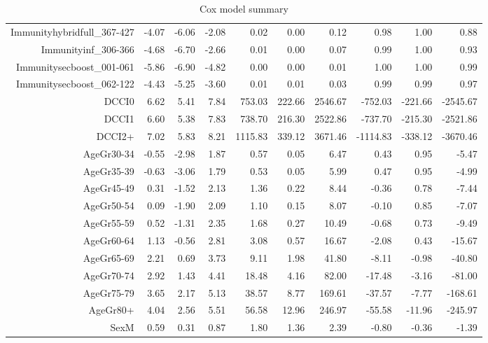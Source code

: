 \begin{table}[ht]
\begin{tabular}{rrrrrrrrrr}
  Immunityhybridfull\_367-427 & -4.07 & -6.06 & -2.08 & 0.02 & 0.00 & 0.12 & 0.98 & 1.00 & 0.88 \\ 
  Immunityinf\_306-366 & -4.68 & -6.70 & -2.66 & 0.01 & 0.00 & 0.07 & 0.99 & 1.00 & 0.93 \\ 
  Immunitysecboost\_001-061 & -5.86 & -6.90 & -4.82 & 0.00 & 0.00 & 0.01 & 1.00 & 1.00 & 0.99 \\ 
  Immunitysecboost\_062-122 & -4.43 & -5.25 & -3.60 & 0.01 & 0.01 & 0.03 & 0.99 & 0.99 & 0.97 \\ 
  DCCI0 & 6.62 & 5.41 & 7.84 & 753.03 & 222.66 & 2546.67 & -752.03 & -221.66 & -2545.67 \\ 
  DCCI1 & 6.60 & 5.38 & 7.83 & 738.70 & 216.30 & 2522.86 & -737.70 & -215.30 & -2521.86 \\ 
  DCCI2+ & 7.02 & 5.83 & 8.21 & 1115.83 & 339.12 & 3671.46 & -1114.83 & -338.12 & -3670.46 \\ 
  AgeGr30-34 & -0.55 & -2.98 & 1.87 & 0.57 & 0.05 & 6.47 & 0.43 & 0.95 & -5.47 \\ 
  AgeGr35-39 & -0.63 & -3.06 & 1.79 & 0.53 & 0.05 & 5.99 & 0.47 & 0.95 & -4.99 \\ 
  AgeGr45-49 & 0.31 & -1.52 & 2.13 & 1.36 & 0.22 & 8.44 & -0.36 & 0.78 & -7.44 \\ 
  AgeGr50-54 & 0.09 & -1.90 & 2.09 & 1.10 & 0.15 & 8.07 & -0.10 & 0.85 & -7.07 \\ 
  AgeGr55-59 & 0.52 & -1.31 & 2.35 & 1.68 & 0.27 & 10.49 & -0.68 & 0.73 & -9.49 \\ 
  AgeGr60-64 & 1.13 & -0.56 & 2.81 & 3.08 & 0.57 & 16.67 & -2.08 & 0.43 & -15.67 \\ 
  AgeGr65-69 & 2.21 & 0.69 & 3.73 & 9.11 & 1.98 & 41.80 & -8.11 & -0.98 & -40.80 \\ 
  AgeGr70-74 & 2.92 & 1.43 & 4.41 & 18.48 & 4.16 & 82.00 & -17.48 & -3.16 & -81.00 \\ 
  AgeGr75-79 & 3.65 & 2.17 & 5.13 & 38.57 & 8.77 & 169.61 & -37.57 & -7.77 & -168.61 \\ 
  AgeGr80+ & 4.04 & 2.56 & 5.51 & 56.58 & 12.96 & 246.97 & -55.58 & -11.96 & -245.97 \\ 
  SexM & 0.59 & 0.31 & 0.87 & 1.80 & 1.36 & 2.39 & -0.80 & -0.36 & -1.39 \\ 
   \hline
\end{tabular}
\caption{Cox model summary} 
\end{table}
